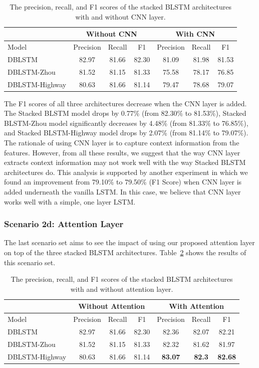 {{\begin{table}
	\caption{The precision, recall, and F1 scores of the stacked BLSTM architectures with and without CNN layer.}
	\centering
	\label{tab:modelselection3}
	\begin{tabular}{|l|ccc|ccc|}
		\hline
		& \multicolumn{3}{c}{ Without CNN } & \multicolumn{3}{c}{ With CNN } \\
		\hline
		Model& Precision & Recall & F1 & Precision & Recall & F1 \\
		\hline \hline
		DBLSTM & 82.97 & 81.66 & 82.30 & 81.09 & 81.98 & 81.53 \\
		DBLSTM-Zhou & 81.52 & 81.15 & 81.33 & 75.58 & 78.17 & 76.85 \\
		DBLSTM-Highway & 80.63 & 81.66 & 81.14 & 79.47& 78.68& 79.07 \\
		\hline
	\end{tabular}

\end{table}

The F1 scores of all three architectures decrease when the CNN layer is added. The Stacked BLSTM model drops by 0.77\% (from 82.30\% to 81.53\%), Stacked BLSTM-Zhou model significantly decreases by 4.48\% (from 81.33\% to 76.85\%), and Stacked BLSTM-Highway model drops by 2.07\% (from 81.14\% to 79.07\%). The rationale of using CNN layer is to capture context information from the features. However, from all these results, we suggest that the way CNN layer extracts context information may not work well with the way Stacked BLSTM architectures do. This analysis is supported by another experiment in which we found an improvement from 79.10\% to 79.50\% (F1 Score) when CNN layer is added underneath the vanilla LSTM. In this case, we believe that CNN layer works well with a simple, one layer LSTM.

\subsubsection{Scenario 2d: Attention Layer}
The last scenario set aims to see the impact of using our proposed attention layer on top of the three stacked BLSTM architectures. Table~\ref{tab:modelselection4} shows the results of this scenario set.

\begin{table}
	\caption{The precision, recall, and F1 scores of the stacked BLSTM architectures with and without attention layer.}
	\centering
	\label{tab:modelselection4}
	\begin{tabular}{|l|ccc|ccc|}
		\hline
		& \multicolumn{3}{c}{ Without Attention } & \multicolumn{3}{c}{ With Attention } \\
		\hline
		Model & Precision & Recall & F1 & Precision & Recall & F1 \\
		\hline \hline
		DBLSTM & 82.97 & 81.66 & 82.30 & 82.36 & 82.07 & 82.21 \\
		DBLSTM-Zhou & 81.52 & 81.15 & 81.33 & 82.32 & 81.62 & 81.97 \\
		DBLSTM-Highway & 80.63 & 81.66 & 81.14 & \textbf{83.07} & \textbf{82.3} & \textbf{82.68} \\
		\hline
	\end{tabular}


\end{table}}}

